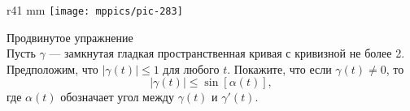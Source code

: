\begin{wrapfigure}{r}{41 mm}
\vskip-4mm
\centering
\texttt{[image: mppics/pic-283]}
\vskip0mm
\end{wrapfigure}

\begin{thm}{Продвинутое упражнение}\label{ex:gromov-twist}\\
Пусть $\gamma$ --- замкнутая гладкая пространственная кривая с кривизной не более 2.
Предположим, что $|\gamma(t)|\le 1$ для любого $t$.
Покажите, что если $\gamma(t)\ne 0$, то 
\[|\gamma(t)| \le \sin [\alpha(t)],\]
где $\alpha(t)$ обозначает угол между $\gamma(t)$ и $\gamma'(t)$.
\end{thm}
